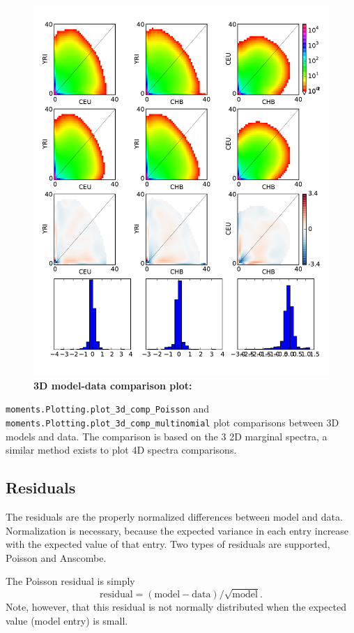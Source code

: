 \documentclass[12pt]{article}
\makeatletter
\newcommand{\py}[1]{\lstinline[language=Python, showstringspaces=False]@#1@}
\makeatother
\begin{document}
\begin{figure}
\centering
\includegraphics[scale=0.5]{3d_comp}
\caption{\textbf{3D model-data comparison plot:}\label{fig:3d_comp}}
\end{figure}

\py{moments.Plotting.plot_3d_comp_Poisson} and \py{moments.Plotting.plot_3d_comp_multinomial} plot comparisons between 3D models and data.
The comparison is based on the 3 2D marginal spectra, a similar method exists to plot 4D spectra comparisons.

\subsection{Residuals}\label{sec:residuals}

The residuals are the properly normalized differences between model and data.
Normalization is necessary, because the expected variance in each entry increase with the expected value of that entry.
Two types of residuals are supported, Poisson and Anscombe.

The Poisson residual is simply
\begin{equation}
\text{residual} = (\text{model} - \text{data})/\sqrt{\text{model}}.
\end{equation}
Note, however, that this residual is not normally distributed when the expected value (model entry) is small.
\end{document}
